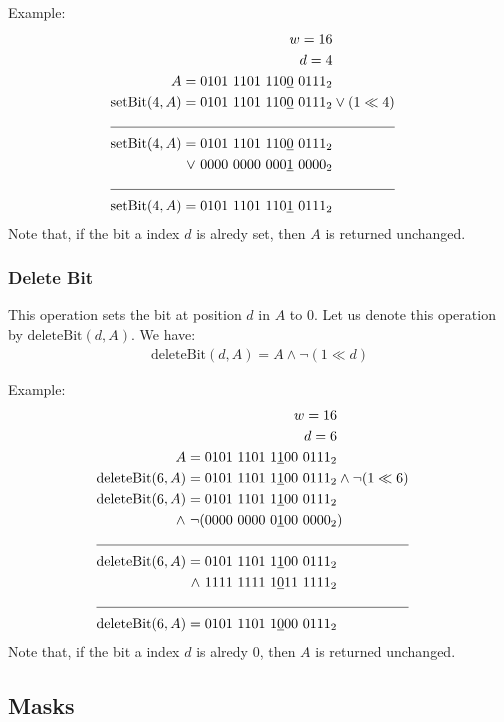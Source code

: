 Example:
\begin{align*}
    w = 16\\
    d = 4\\
    A = 0101\ 1101\ 110\underline{0}\ 0111_2& \\
    \text{setBit}(4,A) = 0101\ 1101\ 110\underline{0}\ 0111_2& \vee (1 \ll 4) \\
    \cline{1-2}
    \text{setBit}(4,A) = 0101\ 1101\ 110\underline{0}\ 0111_2& \\
    \vee\  0000\ 0000\ 000\underline{1}\ 0000_2& \\
    \cline{1-2}
    \text{setBit}(4,A) = 0101\ 1101\ 110\underline{1}\ 0111_2&
\end{align*}
Note that, if the bit a index $d$ is alredy set, then $A$ is returned unchanged.

\subsubsection{Delete Bit}
This operation sets the bit at position $d$ in $A$ to $0$. Let us denote this operation by $\text{deleteBit}(d, A)$. We have:
\begin{align*}
    \text{deleteBit}(d, A) = A \wedge \neg(1 \ll d)
\end{align*}

Example:
\begin{align*}
    w = 16\\
    d = 6\\
    A = 0101\ 1101\ 1\underline{1}00\ 0111_2& \\
    \text{deleteBit}(6,A) = 0101\ 1101\ 1\underline{1}00\ 0111_2& \wedge \neg(1 \ll 6) \\
    \text{deleteBit}(6,A) = 0101\ 1101\ 1\underline{1}00\ 0111_2&\\
    \wedge\ \neg(0000\ 0000\ 0\underline{1}00\ 0000_2&) \\
    \cline{1-2}
    \text{deleteBit}(6,A) = 0101\ 1101\ 1\underline{1}00\ 0111_2& \\
    \wedge\ 1111\ 1111\ 1\underline{0}11\ 1111_2 \\
    \cline{1-2}
    \text{deleteBit}(6,A) = 0101\ 1101\ 1\underline{0}00\ 0111_2&
\end{align*}
Note that, if the bit a index $d$ is alredy $0$, then $A$ is returned unchanged.

\newpage
\subsection{Masks} \label{sec:masks}

